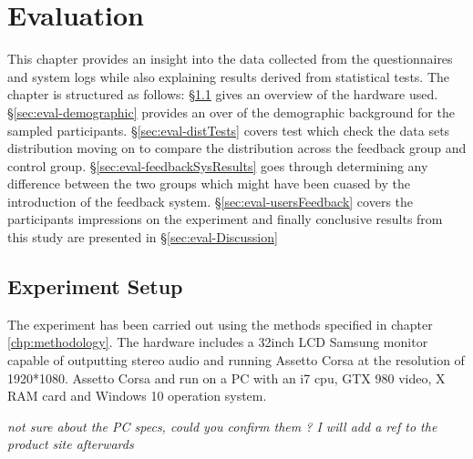 \chapter{Evaluation}
\label{eval}

This chapter provides an insight into the data collected from the questionnaires and \methodname system logs while also explaining results derived from statistical tests. The chapter is structured as follows: \S\ref{sec:eval-experiment} gives an overview of the hardware used. \S\ref{sec:eval-demographic} provides an over of the demographic background for the sampled participants. \S\ref{sec:eval-distTests} covers test which check the data sets distribution moving on to compare the distribution across the feedback group and control group. \S\ref{sec:eval-feedbackSysResults} goes through determining any difference between the two groups which might have been cuased by the introduction of the feedback system. \S\ref{sec:eval-usersFeedback} covers the participants impressions on the experiment and finally conclusive results from this study are presented in \S\ref{sec:eval-Discussion} 

\section{Experiment Setup}
\label{sec:eval-experiment}

The experiment has been carried out using the methods specified in chapter \ref{chp:methodology}. The hardware includes a 32inch LCD Samsung monitor capable of outputting stereo audio and running Assetto Corsa at the resolution of 1920*1080. Assetto Corsa and \methodname run on a PC with an i7 cpu, GTX 980 video, X RAM card and Windows 10 operation system.

\emph{not sure about the PC specs, could you confirm them ? I will add a ref to the product site afterwards}

